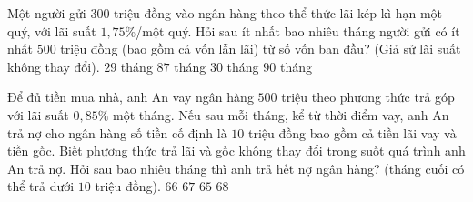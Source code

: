 \begin{ex}
	Một người gửi $300$ triệu đồng vào ngân hàng theo thể thức lãi kép kì hạn một quý, với lãi suất $1{,}75 \%$/một quý. Hỏi sau ít nhất bao nhiêu tháng người gửi có ít nhất $500$ triệu đồng (bao gồm cả vốn lẫn lãi) từ số vốn ban đầu? (Giả sử lãi suất không thay đổi).
	\choice
	{$29$ tháng}
	{$87$ tháng}
	{$30$ tháng}
	{\True $90$ tháng}
\end{ex}
\begin{ex}
	Để đủ tiền mua nhà, anh An vay ngân hàng $500$ triệu theo phương thức trả góp với lãi suất $0{,}85\%$ một tháng. Nếu sau mỗi tháng, kể từ thời điểm vay, anh An trả nợ cho ngân hàng số tiền cố định là $10$ triệu đồng bao gồm cả tiền lãi vay và tiền gốc. Biết phương thức trả lãi và gốc không thay đổi trong suốt quá trình anh An trả nợ. Hỏi sau bao nhiêu tháng thì anh trả hết nợ ngân hàng? (tháng cuối có thể trả dưới $10$ triệu đồng).
	\choice
	{\True $66$}
	{$67$}
	{$65$}
	{$68$}
\end{ex}
